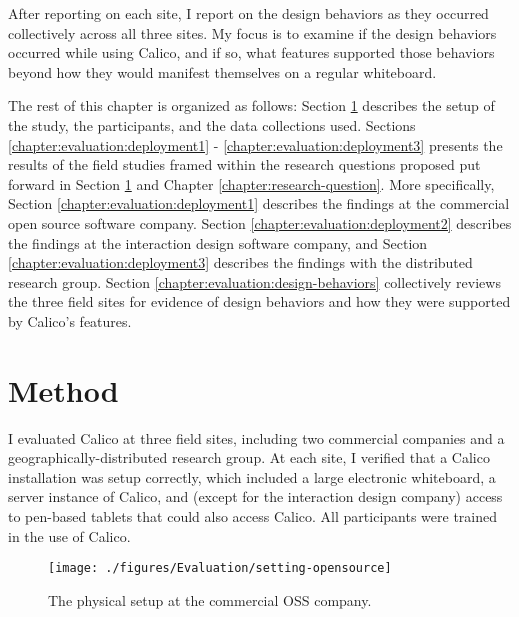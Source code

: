 After reporting on each site, I report on the design behaviors as they occurred collectively across all three sites. My focus is to examine if the design behaviors occurred  while using Calico, and if so, what features supported those behaviors beyond how they would manifest themselves on a regular whiteboard.

The rest of this chapter is organized as follows: Section \ref{chapter:evaluation:overview} describes the setup of the study, the participants, and the data collections used. Sections \ref{chapter:evaluation:deployment1} - \ref{chapter:evaluation:deployment3} presents the results of the field studies framed within the research questions proposed put forward in Section \ref{chapter:evaluation:overview} and Chapter \ref{chapter:research-question}. More specifically, Section \ref{chapter:evaluation:deployment1} describes the findings at the commercial open source software company. Section \ref{chapter:evaluation:deployment2} describes the findings at the interaction design software company, and Section \ref{chapter:evaluation:deployment3} describes the findings with the distributed research group. Section \ref{chapter:evaluation:design-behaviors} collectively reviews the three field sites for evidence of design behaviors and how they were supported by Calico's features. 

\section{Method}
\label{chapter:evaluation:overview}

I evaluated Calico at three field sites, including two commercial companies and a geographically-distributed research group. At each site, I verified that a Calico installation was setup correctly, which included a large electronic whiteboard, a server instance of Calico, and (except for the interaction design company) access to pen-based tablets that could also access Calico. All participants were trained in the use of Calico.

\begin{figure*}[tbh]
  \centering
  \texttt{[image: ./figures/Evaluation/setting-opensource]}
  \caption{The physical setup at the commercial OSS company.}
  \label{fig:evaluation:setting-opensource}
\end{figure*}

